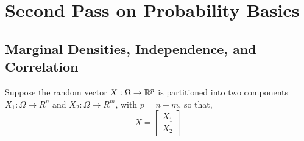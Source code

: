 \section{Second Pass on Probability Basics}
    
    
   \subsection{Marginal Densities, Independence, and Correlation}
        Suppose the random vector $X: \Omega \rightarrow \mathbb R^p$ is partitioned into two components $X_1 : \Omega \rightarrow R^n$ and $X_2:\Omega \rightarrow R^m $, with $p=n+m$, so that,
        $$ X = \left[ \begin{array}{cc} X_1 \\
                                               X_2 \end{array} \right]$$

